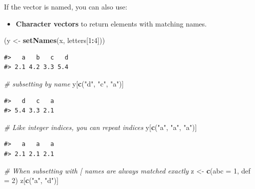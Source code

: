 \documentclass[]{book}
\newenvironment{Shaded}{\begin{snugshade}}{\end{snugshade}}
\newcommand{\KeywordTok}[1]{\textcolor[rgb]{0.13,0.29,0.53}{\textbf{#1}}}
\newcommand{\DataTypeTok}[1]{\textcolor[rgb]{0.13,0.29,0.53}{#1}}
\newcommand{\DecValTok}[1]{\textcolor[rgb]{0.00,0.00,0.81}{#1}}
\newcommand{\StringTok}[1]{\textcolor[rgb]{0.31,0.60,0.02}{#1}}
\newcommand{\CommentTok}[1]{\textcolor[rgb]{0.56,0.35,0.01}{\textit{#1}}}
\newcommand{\OperatorTok}[1]{\textcolor[rgb]{0.81,0.36,0.00}{\textbf{#1}}}
\newcommand{\NormalTok}[1]{#1}
\providecommand{\tightlist}{%
  \setlength{\itemsep}{0pt}\setlength{\parskip}{0pt}}
\theoremstyle{definition}
\theoremstyle{definition}
\theoremstyle{definition}
\theoremstyle{remark}
\begin{document}
If the vector is named, you can also use:

\begin{itemize}
\tightlist
\item
  \textbf{Character vectors} to return elements with matching names.
\end{itemize}

\begin{Shaded}
\begin{Highlighting}[]
\NormalTok{(y <-}\StringTok{ }\KeywordTok{setNames}\NormalTok{(x, letters[}\DecValTok{1}\OperatorTok{:}\DecValTok{4}\NormalTok{]))}
\end{Highlighting}
\end{Shaded}

\begin{verbatim}
#>   a   b   c   d 
#> 2.1 4.2 3.3 5.4
\end{verbatim}

\begin{Shaded}
\begin{Highlighting}[]
\CommentTok{# subsetting by name}
\NormalTok{y[}\KeywordTok{c}\NormalTok{(}\StringTok{"d"}\NormalTok{, }\StringTok{"c"}\NormalTok{, }\StringTok{"a"}\NormalTok{)]}
\end{Highlighting}
\end{Shaded}

\begin{verbatim}
#>   d   c   a 
#> 5.4 3.3 2.1
\end{verbatim}

\begin{Shaded}
\begin{Highlighting}[]
\CommentTok{# Like integer indices, you can repeat indices}
\NormalTok{y[}\KeywordTok{c}\NormalTok{(}\StringTok{"a"}\NormalTok{, }\StringTok{"a"}\NormalTok{, }\StringTok{"a"}\NormalTok{)]}
\end{Highlighting}
\end{Shaded}

\begin{verbatim}
#>   a   a   a 
#> 2.1 2.1 2.1
\end{verbatim}

\begin{Shaded}
\begin{Highlighting}[]
\CommentTok{# When subsetting with [ names are always matched exactly}
\NormalTok{z <-}\StringTok{ }\KeywordTok{c}\NormalTok{(}\DataTypeTok{abc =} \DecValTok{1}\NormalTok{, }\DataTypeTok{def =} \DecValTok{2}\NormalTok{)}
\NormalTok{z[}\KeywordTok{c}\NormalTok{(}\StringTok{"a"}\NormalTok{, }\StringTok{"d"}\NormalTok{)]}
\end{Highlighting}
\end{Shaded}
\end{document}
